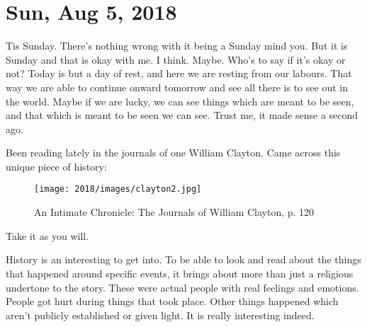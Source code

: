 \section{Sun, Aug 5, 2018}

Tis Sunday. There's nothing wrong with it being a Sunday mind you. But it is Sunday
and that is okay with me. I think. Maybe. Who's to say if it's okay or not? Today is
but a day of rest, and here we are resting from our labours. That way we are able to
continue onward tomorrow and see all there is to see out in the world. Maybe if we
are lucky, we can see things which are meant to be seen, and that which is meant to
be seen we can see. Trust me, it made sense a second ago.

Been reading lately in the journals of one William Clayton. Came across this unique
piece of history:

\begin{figure}[h!]
  \centering
  \texttt{[image: 2018/images/clayton2.jpg]}
  \caption{An Intimate Chronicle: The Journals of William Clayton, p. 120}
  \label{fig:clayton2}
\end{figure}

Take it as you will.

History is an interesting to get into. To be able to look and read about the things
that happened around specific events, it brings about more than just a religious
undertone to the story. These were actual people with real feelings and emotions.
People got hurt during things that took place. Other things happened which aren't
publicly established or given light. It is really interesting indeed.
